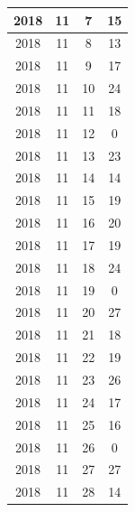 \begin{longtable} {|c|c|c|c|}
\hline
2018         & 11           & 7            & 15                        \\ 
\hline
2018         & 11           & 8            & 13                        \\ 
\hline
2018         & 11           & 9            & 17                        \\ 
\hline
2018         & 11           & 10           & 24                        \\ 
\hline
2018         & 11           & 11           & 18                        \\ 
\hline
2018         & 11           & 12           & 0                         \\ 
\hline
2018         & 11           & 13           & 23                        \\ 
\hline
2018         & 11           & 14           & 14                        \\ 
\hline
2018         & 11           & 15           & 19                        \\ 
\hline
2018         & 11           & 16           & 20                        \\ 
\hline
2018         & 11           & 17           & 19                        \\ 
\hline
2018         & 11           & 18           & 24                        \\ 
\hline
2018         & 11           & 19           & 0                         \\ 
\hline
2018         & 11           & 20           & 27                        \\ 
\hline
2018         & 11           & 21           & 18                        \\ 
\hline
2018         & 11           & 22           & 19                        \\ 
\hline
2018         & 11           & 23           & 26                        \\ 
\hline
2018         & 11           & 24           & 17                        \\ 
\hline
2018         & 11           & 25           & 16                        \\ 
\hline
2018         & 11           & 26           & 0                         \\ 
\hline
2018         & 11           & 27           & 27                        \\ 
\hline
2018         & 11           & 28           & 14                        \\ 

\end{longtable}
